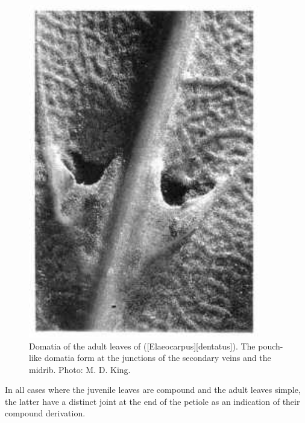 \begin{figure}[htb]
\begin{minipage}[t]{0.498\textwidth}
    	\includegraphics[width=0.9\textwidth]{graphics/figure23hinau.jpg}
    	\caption[Domatia of the adult leaves of hinau]{Domatia of the adult leaves of  ([Elaeocarpus][dentatus]).
        The pouch-like domatia form at the junctions of the secondary veins and the midrib.
    	Photo: M. D. King.}%
    	\label{fig:23hinau}
	\end{minipage}
\end{figure}

In all cases where the juvenile leaves are compound and the adult leaves simple, the latter have a distinct joint at the end of the petiole as an indication of their compound derivation.

